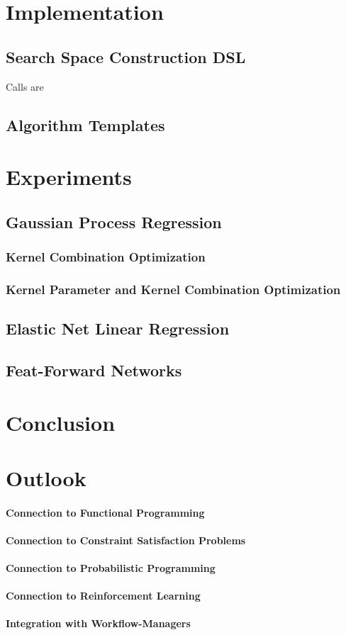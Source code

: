 \documentclass[english]{article}
\begin{document}
\section{Implementation}
\subsection{Search Space Construction DSL}
Calls are 
\subsection{Algorithm Templates}


\section{Experiments}



\subsection{Gaussian Process Regression}
\subsubsection{Kernel Combination Optimization}
\subsubsection{Kernel Parameter and Kernel Combination Optimization}
\subsection{Elastic Net Linear Regression}
\subsection{Feat-Forward Networks}

\section{Conclusion}

\section{Outlook}
\paragraph{Connection to Functional Programming}
\paragraph{Connection to Constraint Satisfaction Problems}
\paragraph{Connection to Probabilistic Programming}
\paragraph{Connection to Reinforcement Learning}
\paragraph{Integration with Workflow-Managers}


\printbibliography
\end{document}
